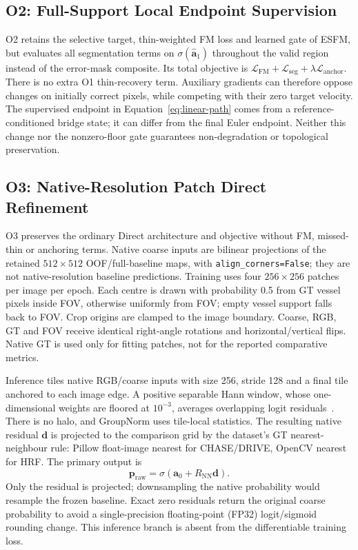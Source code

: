 \documentclass[jimaging,article,submit,pdftex,moreauthors]{Definitions/mdpi}
\begin{document}
\subsection{O2: Full-Support Local Endpoint Supervision}
O2 retains the selective target, thin-weighted FM loss and learned gate of
ESFM, but evaluates all segmentation terms on
$\sigma(\widehat{\mathbf{a}}_1)$ throughout the valid region instead of the
error-mask composite. Its total objective is
$\mathcal{L}_{\mathrm{FM}}+\mathcal{L}_{\mathrm{seg}}
+\lambda\mathcal{L}_{\mathrm{anchor}}$.
There is no extra O1 thin-recovery term. Auxiliary gradients can therefore
oppose changes on initially correct pixels, while competing with their zero
target velocity. The supervised endpoint in Equation~\eqref{eq:linear-path}
comes from a reference-conditioned bridge state; it can differ from the final
Euler endpoint. Neither this change nor the nonzero-floor gate guarantees
non-degradation or topological preservation.

\subsection{O3: Native-Resolution Patch Direct Refinement}
O3 preserves the ordinary Direct architecture and objective without FM,
missed-thin or anchoring terms. Native coarse inputs are bilinear projections
of the retained $512\times512$ OOF/full-baseline maps, with
\texttt{align\_corners=False}; they are not native-resolution baseline
predictions. Training uses four $256\times256$ patches per image per epoch.
Each centre is drawn with probability 0.5 from GT vessel pixels inside FOV,
otherwise uniformly from FOV; empty vessel support falls back to FOV. Crop
origins are clamped to the image boundary. Coarse, RGB, GT and FOV receive
identical right-angle rotations and horizontal/vertical flips. Native GT is
used only for fitting patches, not for the reported comparative metrics.

Inference tiles native RGB/coarse inputs with size 256, stride 128 and a final
tile anchored to each image edge. A positive separable Hann window, whose
one-dimensional weights are floored at $10^{-3}$, averages overlapping logit
residuals~\cite{Pielawski2020}. There is no halo, and GroupNorm uses tile-local
statistics. The resulting native residual $\mathbf{d}$ is projected to the
comparison grid by the dataset's GT nearest-neighbour rule: Pillow float-image
nearest for CHASE/DRIVE, OpenCV nearest for HRF. The primary output is
\begin{equation}
\mathbf{p}_{\mathrm{raw}}=
\sigma\!\left(\mathbf{a}_0+R_{\mathrm{NN}}\mathbf{d}\right).
\label{eq:native-projection}
\end{equation}
Only the residual is projected; downsampling the native probability would
resample the frozen baseline. Exact zero residuals return the original coarse
probability to avoid a single-precision floating-point (FP32) logit/sigmoid
rounding change. This inference
branch is absent from the differentiable training loss.
\end{document}
